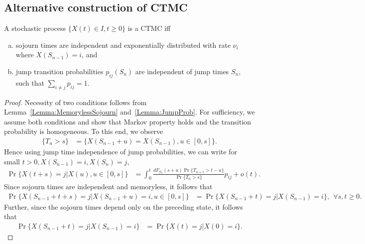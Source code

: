 \documentclass[a4paper,10pt,english]{article}
\begin{document}
\subsection{Alternative construction of CTMC}
\begin{prop} A stochastic process $\{X(t) \in I, t \geqslant 0 \}$ is a CTMC iff 
\begin{enumerate}[a.]
\item sojourn times are independent and exponentially distributed with rate $\nu_i$ where $X(S_{n-1}) = i$, and 
\item jump transition probabilities $p_{ij}(S_n)$ are independent of jump times $S_n$, such that $\sum_{i \neq j}p_{ij}=1$.
\end{enumerate}
\end{prop}
\begin{proof}
Necessity of two conditions follows from Lemma~\ref{Lemma:MemorylessSojourn} and~\ref{Lemma:JumpProb}. 
For sufficiency, we assume both conditions and show that Markov property holds and the transition probability is homogeneous. 
To this end, we observe
\begin{align*}
\{ T_n > s \} &= \{ X(S_{n-1}+ u) = X(S_{n-1}), u \in [0,s] \}.
\end{align*}
Hence using jump time independence of jump probabilities, we can write for small $t > 0, X(S_{n-1})=i, X(S_{n}) = j$, 
\begin{align*}
\Pr\{ X(t+s) = j | X(u), u \in [0,s] \} 
&= \int_0^{t}\frac{dF_{T_n}(s+u)\Pr\{T_{n+1} > t-u\}}{\Pr\{T_n> s\}}p_{ij} + o(t).
\end{align*}
Since sojourn times are independent and memoryless, it follows that
\begin{align*}
\Pr\{ X(S_{n-1} +t+s) = j | X(S_{n-1}+u) = i, u \in [0,s] \} 
&= \Pr\{X(S_{n-1}+t) = j | X(S_{n-1}) = i\}, ~~\forall s, t \geqslant 0.
\end{align*}
Further, since the sojourn times depend only on the preceding state, it follows that 
\begin{align*}
\Pr\{X(S_{n-1}+t) = j | X(S_{n-1}) = i\} &= \Pr\{X(t) = j | X(0) = i\}.
\end{align*}
\end{proof}
\end{document}
